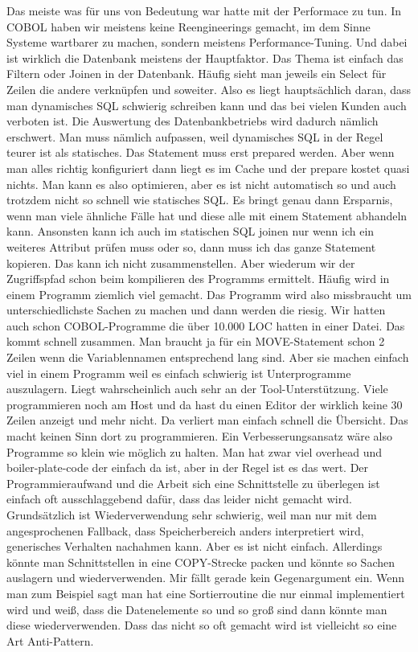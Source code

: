 {    Das meiste was für uns von Bedeutung war hatte mit der Performace zu tun. In COBOL haben wir meistens keine Reengineerings gemacht, im dem Sinne Systeme wartbarer zu machen, sondern meistens Performance-Tuning. Und dabei ist wirklich die Datenbank meistens der Hauptfaktor. Das Thema ist einfach das Filtern oder Joinen in der Datenbank. Häufig sieht man jeweils ein Select für Zeilen die andere verknüpfen und soweiter. Also es liegt hauptsächlich daran, dass man dynamisches SQL schwierig schreiben kann und das bei vielen Kunden auch verboten ist. Die Auswertung des Datenbankbetriebs wird dadurch nämlich erschwert. Man muss nämlich aufpassen, weil dynamisches SQL in der Regel teurer ist als statisches. Das Statement muss erst prepared werden. Aber wenn man alles richtig konfiguriert dann liegt es im Cache und der prepare kostet quasi nichts. Man kann es also optimieren, aber es ist nicht automatisch so und auch trotzdem nicht so schnell wie statisches SQL. Es bringt genau dann Ersparnis, wenn man viele ähnliche Fälle hat und diese alle mit einem Statement abhandeln kann. Ansonsten kann ich auch im statischen SQL joinen nur wenn ich ein weiteres Attribut prüfen muss oder so, dann muss ich das ganze Statement kopieren. Das kann ich nicht zusammenstellen. Aber wiederum wir der Zugriffspfad schon beim kompilieren des Programms ermittelt.
\medskip
    Häufig wird in einem Programm ziemlich viel gemacht. Das Programm wird also missbraucht um unterschiedlichste Sachen zu machen und dann werden die riesig. Wir hatten auch schon COBOL-Programme die über 10.000 LOC hatten in einer Datei. Das kommt schnell zusammen. Man braucht ja für ein MOVE-Statement schon 2 Zeilen wenn die Variablennamen entsprechend lang sind. Aber sie machen einfach viel in einem Programm weil es einfach schwierig ist Unterprogramme auszulagern. Liegt wahrscheinlich auch sehr an der Tool-Unterstützung. Viele programmieren noch am Host und da hast du einen Editor der wirklich keine 30 Zeilen anzeigt und mehr nicht. Da verliert man einfach schnell die Übersicht. Das macht keinen Sinn dort zu programmieren. Ein Verbesserungsansatz wäre also Programme so klein wie möglich zu halten. Man hat zwar viel overhead und boiler-plate-code der einfach da ist, aber in der Regel ist es das wert. Der Programmieraufwand und die Arbeit sich eine Schnittstelle zu überlegen ist einfach oft ausschlaggebend dafür, dass das leider nicht gemacht wird. 
\medskip
    Grundsätzlich ist Wiederverwendung sehr schwierig, weil man nur mit dem angesprochenen Fallback, dass Speicherbereich anders interpretiert wird, generisches Verhalten nachahmen kann. Aber es ist nicht einfach. Allerdings könnte man Schnittstellen in eine COPY-Strecke packen und könnte so Sachen auslagern und wiederverwenden. Mir fällt gerade kein Gegenargument ein. Wenn man zum Beispiel sagt man hat eine Sortierroutine die nur einmal implementiert wird und weiß, dass die Datenelemente so und so groß sind dann könnte man diese wiederverwenden. Dass das nicht so oft gemacht wird ist vielleicht so eine Art Anti-Pattern.
}